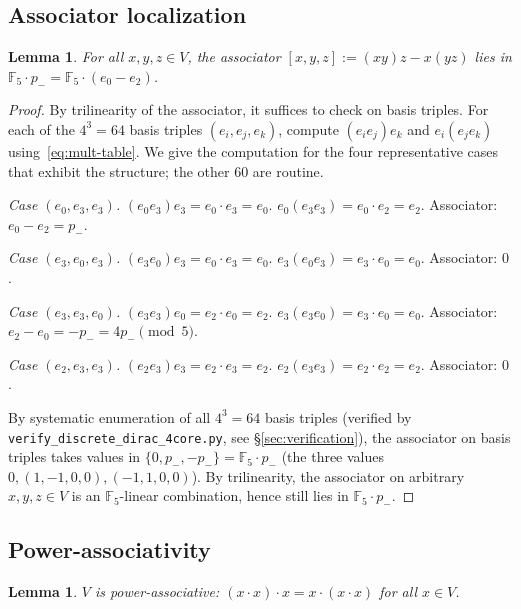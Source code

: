 \documentclass[11pt,reqno]{amsart}
\theoremstyle{plain}
\newtheorem{lemma}[theorem]{Lemma}
\theoremstyle{definition}
\theoremstyle{remark}
\newcommand{\F}{\mathbb{F}}
\begin{document}
\subsection{Associator localization}

\begin{lemma} \label{lem:associator}
For all $x, y, z \in V$, the associator $[x, y, z] := (xy)z - x(yz)$ lies in $\F_5 \cdot p_- = \F_5 \cdot (e_0 - e_2)$.
\end{lemma}

\begin{proof}
By trilinearity of the associator, it suffices to check on basis triples. For each of the $4^3 = 64$ basis triples $(e_i, e_j, e_k)$, compute $(e_i e_j) e_k$ and $e_i (e_j e_k)$ using~\eqref{eq:mult-table}. We give the computation for the four representative cases that exhibit the structure; the other 60 are routine.

\emph{Case $(e_0, e_3, e_3)$.} $(e_0 e_3) e_3 = e_0 \cdot e_3 = e_0$. $e_0 (e_3 e_3) = e_0 \cdot e_2 = e_2$. Associator: $e_0 - e_2 = p_-$.

\emph{Case $(e_3, e_0, e_3)$.} $(e_3 e_0) e_3 = e_0 \cdot e_3 = e_0$. $e_3 (e_0 e_3) = e_3 \cdot e_0 = e_0$. Associator: $0$.

\emph{Case $(e_3, e_3, e_0)$.} $(e_3 e_3) e_0 = e_2 \cdot e_0 = e_2$. $e_3 (e_3 e_0) = e_3 \cdot e_0 = e_0$. Associator: $e_2 - e_0 = -p_- = 4 p_- \pmod 5$.

\emph{Case $(e_2, e_3, e_3)$.} $(e_2 e_3) e_3 = e_2 \cdot e_3 = e_2$. $e_2 (e_3 e_3) = e_2 \cdot e_2 = e_2$. Associator: $0$.

By systematic enumeration of all $4^3 = 64$ basis triples (verified by \texttt{verify\_discrete\_dirac\_4core.py}, see §\ref{sec:verification}), the associator on basis triples takes values in $\{0, p_-, -p_-\} = \F_5 \cdot p_-$ (the three values $0, (1, -1, 0, 0), (-1, 1, 0, 0)$). By trilinearity, the associator on arbitrary $x, y, z \in V$ is an $\F_5$-linear combination, hence still lies in $\F_5 \cdot p_-$.
\end{proof}

\subsection{Power-associativity}

\begin{lemma} \label{lem:powerassoc}
$V$ is power-associative: $(x \cdot x) \cdot x = x \cdot (x \cdot x)$ for all $x \in V$.
\end{lemma}
\end{document}
